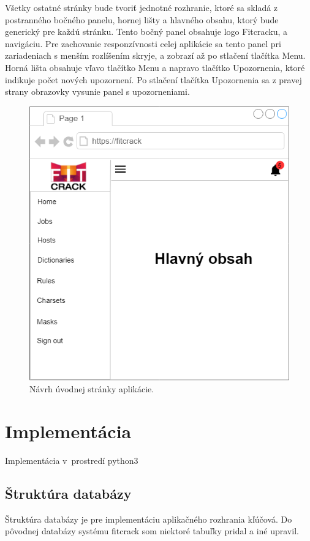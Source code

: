 \documentclass[slovak,cprint]{fitthesis} %
\begin{document}
Všetky ostatné stránky bude tvoriť jednotné rozhranie, ktoré sa skladá z postranného bočného panelu, hornej lišty a hlavného obsahu, ktorý bude generický pre každú stránku. Tento bočný panel obsahuje logo Fitcracku, a navigáciu. Pre zachovanie responzívnosti celej aplikácie sa tento panel pri zariadeniach  s menším rozlíšením skryje, a zobrazí až po stlačení tlačítka Menu. Horná lišta obsahuje vľavo tlačítko Menu a napravo tlačítko Upozornenia, ktoré indikuje počet nových upozornení. Po stlačení tlačítka Upozornenia sa z pravej strany obrazovky vysunie panel s upozorneniami.
\begin{figure}[h]
    \label{fig:moduly}
    \centering
    \includegraphics[scale=0.8]{obrazky/mainPage.png}
    \caption{Návrh úvodnej stránky aplikácie.}
\end{figure}

\chapter{Implementácia}\label{implementacia}
Implementácia v~prostredí python3


\section{Štruktúra databázy}
Štruktúra databázy je pre implementáciu aplikačného rozhrania kľúčová. Do pôvodnej databázy systému fitcrack som niektoré tabuľky pridal a iné upravil.
\end{document}
